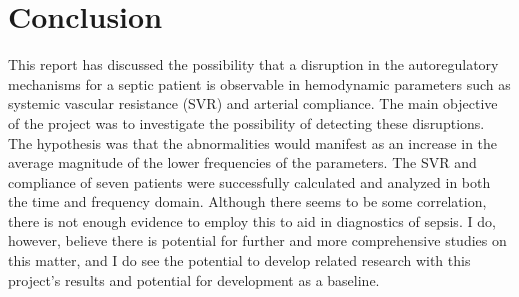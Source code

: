 
\chapter{Conclusion}

This report has discussed the possibility that a disruption in the autoregulatory mechanisms for a septic patient is observable in hemodynamic parameters such as systemic vascular resistance (SVR) and arterial compliance. The main objective of the project was to investigate the possibility of detecting these disruptions. The hypothesis was that the abnormalities would manifest as an increase in the average magnitude of the lower frequencies of the parameters. The SVR and compliance of seven patients were successfully calculated and analyzed in both the time and frequency domain. Although there seems to be some correlation, there is not enough evidence to employ this to aid in diagnostics of sepsis. I do, however, believe there is potential for further and more comprehensive studies on this matter, and I do see the potential to develop related research with this project's results and potential for development as a baseline.

\cleardoublepage